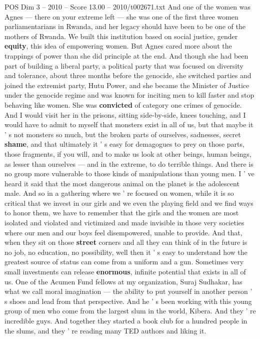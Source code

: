 \begin{textsample}{POS Dim 3 – 2010 – Score 13.00 – 2010/t002671.txt}
And one of the women was Agnes — there on your extreme left — she was one of the first three women parliamentarians in Rwanda, and her legacy should have been to be one of the mothers of Rwanda.
We built this institution based on social justice, gender \textbf{equity}, this idea of empowering women.
But Agnes cared more about the trappings of power than she did principle at the end.
And though she had been part of building a liberal party, a political party that was focused on diversity and tolerance, about three months before the genocide, she switched parties and joined the extremist party, Hutu Power, and she became the Minister of Justice under the genocide regime and was known for inciting men to kill faster and stop behaving like women.
She was \textbf{convicted} of category one crimes of genocide.
And I would visit her in the prisons, sitting side-by-side, knees touching, and I would have to admit to myself that monsters exist in all of us, but that maybe it ' s not monsters so much, but the broken parts of ourselves, sadnesses, secret \textbf{shame}, and that ultimately it ' s easy for demagogues to prey on those parts, those fragments, if you will, and to make us look at other beings, human beings, as lesser than ourselves — and in the extreme, to do terrible things.
And there is no group more vulnerable to those kinds of manipulations than young men.
I ' ve heard it said that the most dangerous animal on the planet is the adolescent male.
And so in a gathering where we ' re focused on women, while it is so critical that we invest in our girls and we even the playing field and we find ways to honor them, we have to remember that the girls and the women are most isolated and violated and victimized and made invisible in those very societies where our men and our boys feel disempowered, unable to provide.
And that, when they sit on those \textbf{street} corners and all they can think of in the future is no job, no education, no possibility, well then it ' s easy to understand how the greatest source of status can come from a uniform and a gun.
Sometimes very small investments can release \textbf{enormous}, infinite potential that exists in all of us.
One of the Acumen Fund fellows at my organization, Suraj Sudhakar, has what we call moral imagination — the ability to put yourself in another person ' s shoes and lead from that perspective.
And he ' s been working with this young group of men who come from the largest slum in the world, Kibera.
And they ' re incredible guys.
And together they started a book club for a hundred people in the slums, and they ' re reading many TED authors and liking it.

\end{textsample}

